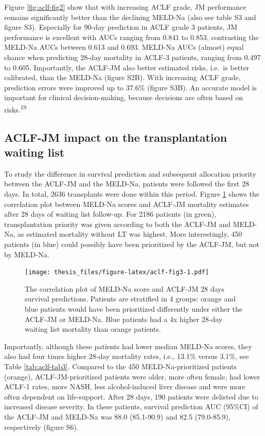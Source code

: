 \documentclass[11pt,english,]{book} %
\begin{document}
Figure \ref{fig:aclf-fig2} show that with increasing ACLF grade, JM performance remains significantly better than the declining MELD-Na (also see table S3 and figure S3). Especially for 90-day prediction in ACLF grade 3 patients, JM performance is excellent with AUCs ranging from 0.841 to 0.853, contrasting the MELD-Na AUCs between 0.613 and 0.693. MELD-Na AUCs (almost) equal chance when predicting 28-day mortality in ACLF-3 patients, ranging from 0.497 to 0.605. Importantly, the ACLF-JM also better estimated risks, i.e.~is better calibrated, than the MELD-Na (figure S2B). With increasing ACLF grade, prediction errors were improved up to 37.6\% (figure S3B). An accurate model is important for clinical decision-making, because decisions are often based on risks.\textsuperscript{19}

\hypertarget{aclf-jm-impact-on-the-transplantation-waiting-list-1}{%
\subsection*{ACLF-JM impact on the transplantation waiting list}\label{aclf-jm-impact-on-the-transplantation-waiting-list-1}}

To study the difference in survival prediction and subsequent allocation priority between the ACLF-JM and the MELD-Na, patients were followed the first 28 days. In total, 2636 transplants were done within this period. Figure \ref{fig:aclf-fig3} shows the correlation plot between MELD-Na scores and ACLF-JM mortality estimates after 28 days of waiting list follow-up. For 2186 patients (in green), transplantation priority was given according to both the ACLF-JM and MELD-Na, as estimated mortality without LT was highest. More interestingly, 450 patients (in blue) could possibly have been prioritized by the ACLF-JM, but not by MELD-Na.

\begin{figure}
\centering
\texttt{[image: thesis\_files/figure-latex/aclf-fig3-1.pdf]}
\caption{\label{fig:aclf-fig3}The correlation plot of MELD-Na score and ACLF-JM 28 days survival predictions. Patients are stratified in 4 groups: orange and blue patients would have been prioritized differently under either the ACLF-JM or MELD-Na. Blue patients had a 4x higher 28-day waiting list mortality than orange patients.}
\end{figure}

Importantly, although these patients had lower median MELD-Na scores, they also had four times higher 28-day mortality rates, i.e., 13.1\% versus 3.1\%, see Table \ref{tab:aclf-tab3}. Compared to the 450 MELD-Na-prioritized patients (orange), ACLF-JM-prioritized patients were older, more often female, had lower ACLF-1 rates, more NASH, less alcohol-induced liver disease and were more often dependent on life-support. After 28 days, 190 patients were delisted due to increased disease severity. In these patients, survival prediction AUC (95\%CI) of the ACLF-JM and MELD-Na was 88.0 (85.1-90.9) and 82.5 (79.0-85.9), respectively (figure S6).
\end{document}
